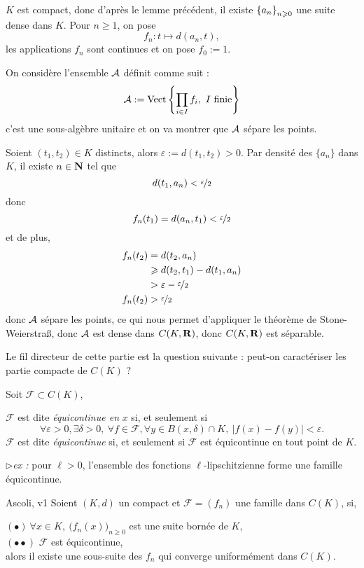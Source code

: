 \documentclass[a4paper,11pt, twoside]{article}
\begin{document}
\begin{Proof}
  $K$ est compact, donc d'après le lemme précédent, il existe $\left\{a_n\right\}_{n\geqslant 0}$ une suite dense dans $K$. Pour $n\geqslant 1$, on pose 
  $$f_n:t\longmapsto d(a_n,t),$$
  les applications $f_n$ sont continues et on pose $f_0:=1$.

  On considère l'ensemble $\mathcal A$ définit comme suit :
  $$\mathcal A:=\mathrm{Vect}\left\{\prod_{i\in I}f_i,\ I\text{ finie}\right\}$$
  c'est une sous-algèbre unitaire et on va montrer que $\mathcal A$ sépare les points.

  Soient $(t_1,t_2)\in K$ distincts, alors $\varepsilon:=d(t_1,t_2)>0$. Par densité des $\{a_n\}$ dans $K$, il existe $n\in\mathbf N$ tel que 
  $$d(t_1,a_n)<\nicefrac{\varepsilon}{2}$$
  donc 
  $$f_n(t_1)=d(a_n,t_1)<\nicefrac{\varepsilon}{2}$$
  et de plus,
  \begin{align*}
    f_n(t_2)&=d(t_2,a_n)\\
    &\geqslant d(t_2,t_1)-d(t_1,a_n)\\
    &>\varepsilon-\nicefrac{\varepsilon}{2}\\
    f_n(t_2)&>\nicefrac{\varepsilon}{2}
  \end{align*}
  donc $\mathcal A$ sépare les points, ce qui nous permet d'appliquer le théorème de Stone-Weierstra\ss, donc $\mathcal A$ est dense dans $C(K,\mathbf R)$, donc $C(K,\mathbf R)$ est séparable.
\end{Proof}





Le fil directeur de cette partie est la question suivante : peut-on caractériser les partie compacte de $C(K)$ ?


\begin{Def}
  Soit $\mathcal F\subset C(K)$,

  $\mathcal F$ est dite \emph{équicontinue en }$x$ si, et seulement si
  $$\forall \varepsilon>0, \exists\delta>0,\ \forall f\in\mathcal F, \forall y\in B(x,\delta)\cap K,\ |f(x)-f(y)|<\varepsilon.$$
  $\mathcal F$ est dite \emph{équicontinue} si, et seulement si $\mathcal F$ est équicontinue en tout point de $K$.
\end{Def}

$\triangleright$\emph{ex : }pour $\ell>0$, l'ensemble des fonctions $\ell$-lipschitzienne forme une famille équicontinue.


\begin{thC}{Ascoli, v1}
  Soient $(K,d)$ un compact et $\mathcal F=(f_n)$ une famille dans $C(K)$, si,

  $(\bullet)\ \forall x\in K,\ \big(f_n(x)\big)_{n\geqslant 0}$ est une suite bornée de $K$,\\
  $(\bullet\bullet)$ $\mathcal F$ est équicontinue,\\

  alors il existe une sous-suite des $f_n$ qui converge uniformément dans $C(K).$
\end{thC}
\end{document}
